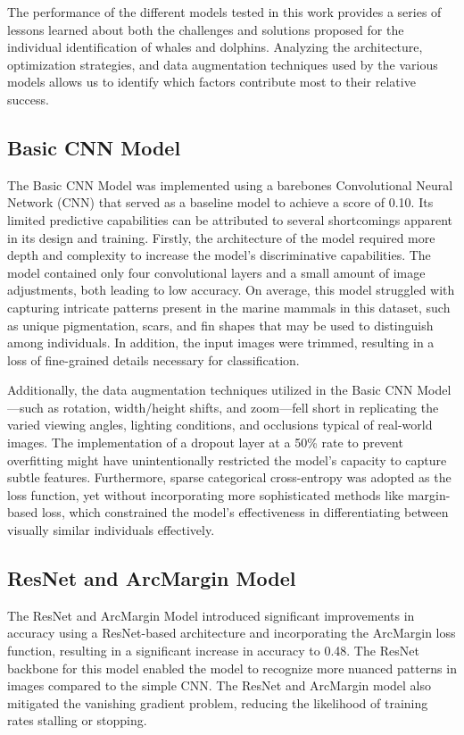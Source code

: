 \documentclass[twocolumn]{article}
\begin{document}
The performance of the different models tested in this work provides a series of lessons learned about both the challenges and solutions proposed for the individual identification of whales and dolphins. Analyzing the architecture, optimization strategies, and data augmentation techniques used by the various models allows us to identify which factors contribute most to their relative success.

\subsection{Basic CNN Model}

The Basic CNN Model was implemented using a barebones Convolutional Neural Network (CNN) that served as a baseline model to achieve a score of 0.10. Its limited predictive capabilities can be attributed to several shortcomings apparent in its design and training. Firstly, the architecture of the model required more depth and complexity to increase the model’s discriminative capabilities. The model contained only four convolutional layers and a small amount of image adjustments, both leading to low accuracy. On average, this model struggled with capturing intricate patterns present in the marine mammals in this dataset, such as unique pigmentation, scars, and fin shapes that may be used to distinguish among individuals. In addition, the input images were trimmed, resulting in a loss of fine-grained details necessary for classification. 

Additionally, the data augmentation techniques utilized in the Basic CNN Model—such as rotation, width/height shifts, and zoom—fell short in replicating the varied viewing angles, lighting conditions, and occlusions typical of real-world images. The implementation of a dropout layer at a 50\% rate to prevent overfitting might have unintentionally restricted the model’s capacity to capture subtle features. Furthermore, sparse categorical cross-entropy was adopted as the loss function, yet without incorporating more sophisticated methods like margin-based loss, which constrained the model’s effectiveness in differentiating between visually similar individuals effectively.

\subsection{ResNet and ArcMargin Model}

The ResNet and ArcMargin Model introduced significant improvements in accuracy using a ResNet-based architecture and incorporating the ArcMargin loss function, resulting in a significant increase in accuracy to 0.48. The ResNet backbone for this model enabled the model to recognize more nuanced patterns in images compared to the simple CNN. The ResNet and ArcMargin model also mitigated the vanishing gradient problem, reducing the likelihood of training rates stalling or stopping.
\end{document}
